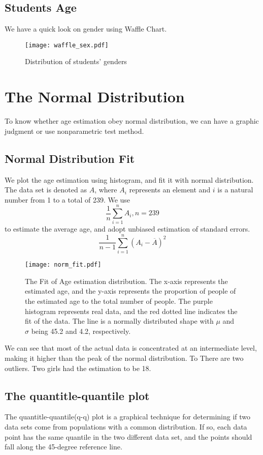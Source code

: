 \documentclass[fancy,11pt,twocol]{elegantbook}
\begin{document}
\section{Students Age}
We have a quick look on gender using Waffle Chart.
\begin{figure}[htbp]
	\centering
	\texttt{[image: waffle\_sex.pdf]}
	\caption{Distribution of students' genders}
\end{figure}


\chapter{The Normal Distribution}
To know whether age estimation obey normal distribution, we can have a graphic judgment or use nonparametric test method. 

\section{Normal Distribution Fit}
We plot the age estimation using histogram, and fit it with normal distribution. 
The data set is denoted as $A$, where $A_i$ represents an element and $i$ is a natural number from 1 to a total of 239.
We use $$
\frac{1}{n} \sum_{i=1}^{n} A_{i}
, n= 239$$ to estimate the average age, and adopt unbiased estimation of standard errors. 
$$
\frac{1}{n-1} \sum_{i=1}^{n}\left(A_{i}-\overline{A}\right)^{2}
$$
\begin{figure}[htbp]
	\centering
	\texttt{[image: norm\_fit.pdf]}
	\caption{The Fit of Age estimation distribution. 
	The x-axis represents the estimated age, 
	and the y-axis represents the proportion of people of the estimated age to the total number of people. 
	The purple histogram represents real data, and the red dotted line indicates the fit of the data. 
	The line is a normally distributed shape with $\mu$ and $\sigma$ being 45.2 and 4.2, respectively.  }
\end{figure}

We can see that most of the actual data is concentrated at an intermediate level, making it higher than the peak of the normal distribution. To 
There are two outliers. Two girls had the estimation to be 18.
\section{The quantitle-quantile plot}
\begin{introduction}
	\item The quantitle-quantile(q-q) plot is a graphical technique for determining if two data sets come from populations with a common distribution. If so, each data point has the same quantile in the two different data set, and the points should fall along the 45-degree reference line.
\end{introduction}
\end{document}
